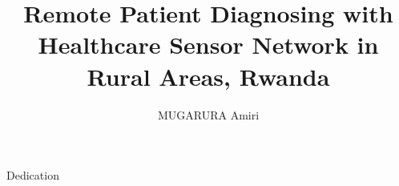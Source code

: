 \documentclass[masters]{ucbthesis}
\begin{document}

\title{Remote Patient Diagnosing with Healthcare Sensor Network in Rural Areas, Rwanda}
\author{MUGARURA Amiri}
\degreesemester{}
\othermembers{}


\maketitle
\approvalpage
\copyrightpage



\begin{frontmatter}


\begin{dedication}
\null\vfil
\begin{center}
Dedication\\\vspace{12pt}

\end{center}
\vfil\null
\end{dedication}



\tableofcontents
\clearpage
\listoffigures
\clearpage
\listoftables

\begin{acknowledgements}

\end{acknowledgements}

\end{frontmatter}

\pagestyle{headings}










\printbibliography
\end{document}
